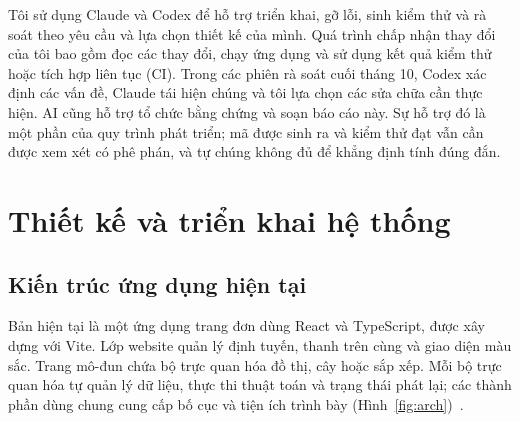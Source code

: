 \documentclass[11pt,a4paper]{article}
\begin{document}
Tôi sử dụng Claude và Codex để hỗ trợ triển khai, gỡ lỗi, sinh kiểm thử và rà soát theo yêu cầu và lựa chọn thiết kế của mình. Quá trình chấp nhận thay đổi của tôi bao gồm đọc các thay đổi, chạy ứng dụng và sử dụng kết quả kiểm thử hoặc tích hợp liên tục (CI). Trong các phiên rà soát cuối tháng 10, Codex xác định các vấn đề, Claude tái hiện chúng và tôi lựa chọn các sửa chữa cần thực hiện. AI cũng hỗ trợ tổ chức bằng chứng và soạn báo cáo này. Sự hỗ trợ đó là một phần của quy trình phát triển; mã được sinh ra và kiểm thử đạt vẫn cần được xem xét có phê phán, và tự chúng không đủ để khẳng định tính đúng đắn.

\nextsection
\section{Thiết kế và triển khai hệ thống}
\subsection{Kiến trúc ứng dụng hiện tại}
Bản hiện tại là một ứng dụng trang đơn dùng React và TypeScript, được xây dựng với Vite. Lớp website quản lý định tuyến, thanh trên cùng và giao diện màu sắc. Trang mô-đun chứa bộ trực quan hóa đồ thị, cây hoặc sắp xếp. Mỗi bộ trực quan hóa tự quản lý dữ liệu, thực thi thuật toán và trạng thái phát lại; các thành phần dùng chung cung cấp bố cục và tiện ích trình bày (Hình~\ref{fig:arch})~\cite{architecture}.
\end{document}
